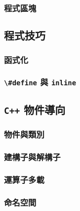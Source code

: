 \documentclass[12pt,a4paper,oneside]{article}
\begin{document}
\begin{CJK}{UTF8}{bkai}
\subsubsection{程式區塊}

\subsection{程式技巧}
\subsubsection{函式化}
\subsubsection{\lstinline!\#define! 與 \lstinline!inline!}

\subsection{\texttt{C++} 物件導向}
\subsubsection{物件與類別}
\subsubsection{建構子與解構子}
\subsubsection{運算子多載}

\subsubsection{命名空間}

\ifx \allfiles \undefined

\printindex

\clearpage
\end{CJK}
\end{document}
